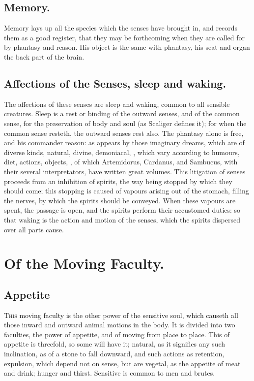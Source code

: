 {\subsection{Memory.}
Memory lays up all the species which the senses have brought
in, and records them as a good register, that they may be forthcoming
when they are called for by phantasy and reason. His object is the same
with phantasy, his seat and organ the back part of the brain.
\subsection[Affections of the Senses]{Affections of the Senses, sleep and waking.}
The affections of these senses are sleep and waking, common to all sensible creatures. Sleep is
a rest or binding of the outward senses, and of the common sense, for
the preservation of body and soul (as Scaliger defines it); for
when the common sense resteth, the outward senses rest also. The
phantasy alone is free, and his commander reason: as appears by those
imaginary dreams, which are of diverse kinds, natural, divine,
demoniacal, \etc{}, which vary according to humours, diet, actions,
objects, \etc{}, of which Artemidorus, Cardanus, and Sambucus, with their
several interpretators, have written great volumes. This litigation of
senses proceeds from an inhibition of spirits, the way being stopped by
which they should come; this stopping is caused of vapours arising out
of the stomach, filling the nerves, by which the spirits should be
conveyed. When these vapours are spent, the passage is open, and the
spirits perform their accustomed duties: so that waking is the action
and motion of the senses, which the spirits dispersed over all parts
cause.

\section{Of the Moving Faculty.}

\subsection{Appetite}
\lettrine{T}{his} moving faculty is the other power of the sensitive
soul, which causeth all those inward and outward animal motions in the
body. It is divided into two faculties, the power of appetite, and of
moving from place to place. This of appetite is threefold, so some will
have it; natural, as it signifies any such inclination, as of a stone
to fall downward, and such actions as retention, expulsion, which
depend not on sense, but are vegetal, as the appetite of meat and
drink; hunger and thirst. Sensitive is common to men and brutes.

}
